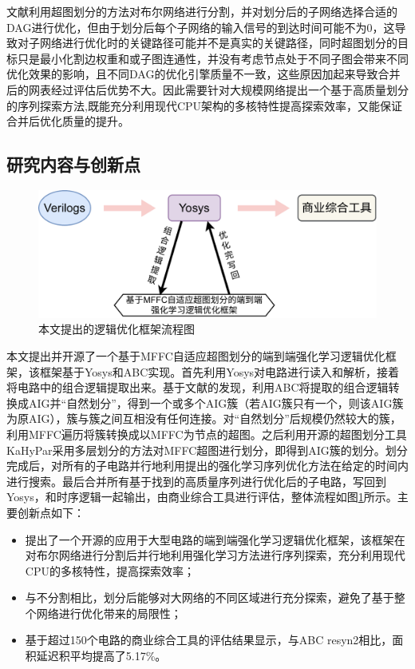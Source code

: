 文献\cite{LS:LSOracle}利用超图划分的方法对布尔网络进行分割，并对划分后的子网络选择合适的DAG进行优化，但由于划分后每个子网络的输入信号的到达时间可能不为0，这导致对子网络进行优化时的关键路径可能并不是真实的关键路径，同时超图划分的目标只是最小化割边权重和或子图连通性，并没有考虑节点处于不同子图会带来不同优化效果的影响，且不同DAG的优化引擎质量不一致，这些原因加起来导致合并后的网表经过评估后优势不大。因此需要针对大规模网络提出一个基于高质量划分的序列探索方法,既能充分利用现代CPU架构的多核特性提高探索效率，又能保证合并后优化质量的提升。

\subsection{研究内容与创新点}

\begin{figure}[!htbp]
    \centering
    \includegraphics[width=\linewidth]{./figs/LS-MFFC_rl.pdf}
    \caption{本文提出的逻辑优化框架流程图}
    \label{LS:MFFC_rl}
\end{figure}

本文提出并开源了一个基于MFFC自适应超图划分的端到端强化学习逻辑优化框架，该框架基于Yosys\cite{LS:yosys}和ABC\cite{LS:ABC}实现。首先利用Yosys对电路进行读入和解析，接着将电路中的组合逻辑提取出来。基于文献\cite{Moucheng_Yang}的发现，利用ABC将提取的组合逻辑转换成AIG并“自然划分”，得到一个或多个AIG簇（若AIG簇只有一个，则该AIG簇为原AIG），簇与簇之间互相没有任何连接。对“自然划分”后规模仍然较大的簇，利用MFFC遍历将簇转换成以MFFC为节点的超图。之后利用开源的超图划分工具KaHyPar\cite{KaHyPar}采用多层划分的方法对MFFC超图进行划分，即得到AIG簇的划分。划分完成后，对所有的子电路并行地利用提出的强化学习序列优化方法在给定的时间内进行搜索。最后合并所有基于找到的高质量序列进行优化后的子电路，写回到Yosys，和时序逻辑一起输出，由商业综合工具进行评估，整体流程如图\ref{LS:MFFC_rl}所示。主要创新点如下：
\begin{itemize}
    \item 提出了一个开源的应用于大型电路的端到端强化学习逻辑优化框架，该框架在对布尔网络进行分割后并行地利用强化学习方法进行序列探索，充分利用现代CPU的多核特性，提高探索效率；
    \item 与不分割相比，划分后能够对大网络的不同区域进行充分探索，避免了基于整个网络进行优化带来的局限性；
    \item 基于超过150个电路的商业综合工具的评估结果显示，与ABC resyn2相比，面积延迟积平均提高了5.17\%。
\end{itemize}


